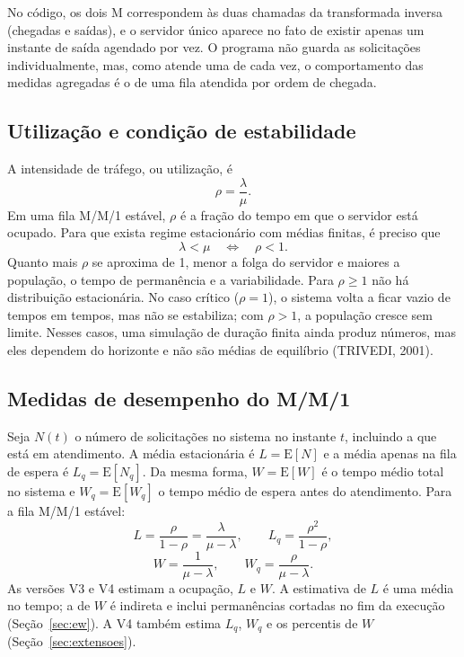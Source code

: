 \documentclass[
  article,      %
  10pt,         %
  oneside,
  a4paper,
  twocolumn,    %
  english,
  brazil        %
]{abntex2}
\newcommand{\EN}{\mathrm{E}[N]}
\newcommand{\EW}{\mathrm{E}[W]}
\newcommand{\ENq}{\mathrm{E}[N_q]}
\newcommand{\EWq}{\mathrm{E}[W_q]}
\begin{document}
No código, os dois M correspondem às duas chamadas da transformada inversa (chegadas e saídas), e o servidor único aparece no fato de existir apenas um instante de saída agendado por vez. O programa não guarda as solicitações individualmente, mas, como atende uma de cada vez, o comportamento das medidas agregadas é o de uma fila atendida por ordem de chegada.

\subsection{Utilização e condição de estabilidade}

A intensidade de tráfego, ou utilização, é
\begin{equation}
  \rho=\frac{\lambda}{\mu}.
  \label{eq:rho}
\end{equation}
Em uma fila M/M/1 estável, $\rho$ é a fração do tempo em que o servidor está ocupado. Para que exista regime estacionário com médias finitas, é preciso que
\begin{equation}
  \lambda<\mu \quad\Longleftrightarrow\quad \rho<1.
  \label{eq:estabilidade}
\end{equation}
Quanto mais $\rho$ se aproxima de 1, menor a folga do servidor e maiores a população, o tempo de permanência e a variabilidade. Para $\rho\geq1$ não há distribuição estacionária. No caso crítico ($\rho=1$), o sistema volta a ficar vazio de tempos em tempos, mas não se estabiliza; com $\rho>1$, a população cresce sem limite. Nesses casos, uma simulação de duração finita ainda produz números, mas eles dependem do horizonte e não são médias de equilíbrio (TRIVEDI, 2001).

\subsection{Medidas de desempenho do M/M/1}

Seja $N(t)$ o número de solicitações no sistema no instante $t$, incluindo a que está em atendimento. A média estacionária é $L=\EN$ e a média apenas na fila de espera é $L_q=\ENq$. Da mesma forma, $W=\EW$ é o tempo médio total no sistema e $W_q=\EWq$ o tempo médio de espera antes do atendimento. Para a fila M/M/1 estável:
\begin{equation}
  L=\frac{\rho}{1-\rho}=\frac{\lambda}{\mu-\lambda},
  \qquad L_q=\frac{\rho^2}{1-\rho},
  \label{eq:l-lq}
\end{equation}
\begin{equation}
  W=\frac{1}{\mu-\lambda},
  \qquad W_q=\frac{\rho}{\mu-\lambda}.
  \label{eq:w-wq}
\end{equation}
As versões V3 e V4 estimam a ocupação, $L$ e $W$. A estimativa de $L$ é uma média no tempo; a de $W$ é indireta e inclui permanências cortadas no fim da execução (Seção~\ref{sec:ew}). A V4 também estima $L_q$, $W_q$ e os percentis de $W$ (Seção~\ref{sec:extensoes}).
\end{document}
